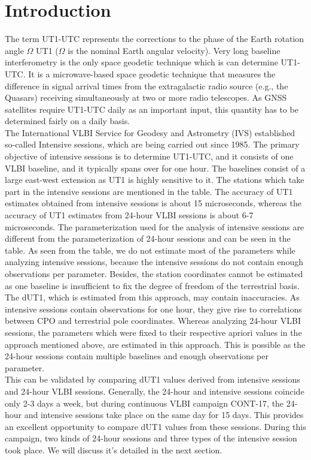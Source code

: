 \documentclass[smallextended]{svjour3}       %
\begin{document}
\section{Introduction}
\label{intro}
The term UT1-UTC represents the corrections to the phase of the Earth rotation angle $\Omega$ UT1 ($\Omega$ is the nominal Earth angular velocity). Very long baseline interferometry is the only space geodetic technique which is can determine UT1-UTC. It is a microwave-based space geodetic technique that measures the difference in signal arrival times from the extragalactic radio source (e.g., the Quasars) receiving simultaneously at two or more radio telescopes. As GNSS satellites require UT1-UTC daily as an important input, this quantity has to be determined fairly on a daily basis. \\
The International VLBI Service for Geodesy and Astrometry (IVS) established so-called Intensive sessions, which are being carried out since 1985. The primary objective of intensive sessions is to determine UT1-UTC, and it consists of one VLBI baseline, and it typically spans over for one hour. The baselines consist of a large east-west extension as UT1 is highly sensitive to it. The stations which take part in the intensive sessions are mentioned in the table. The accuracy of UT1 estimates obtained from intensive sessions is about 15 microseconds, whereas the accuracy of UT1 estimates from 24-hour VLBI sessions is about 6-7 microseconds. The parameterization used for the analysis of intensive sessions are different from the parameterization of 24-hour sessions and can be seen in the table. As seen from the table, we do not estimate most of the parameters while analyzing intensive sessions, because the intensive sessions do not contain enough observations per parameter. Besides, the station coordinates cannot be estimated as one baseline is insufficient to fix the degree of freedom of the terrestrial basis. The dUT1, which is estimated from this approach, may contain inaccuracies. As intensive sessions contain observations for one hour, they give rise to correlations between CPO and terrestrial pole coordinates. Whereas analyzing 24-hour VLBI sessions, the parameters which were fixed to their respective apriori values in the approach mentioned above, are estimated in this approach. This is possible as the 24-hour sessions contain multiple baselines and enough observations per parameter. \\
This can be validated by comparing dUT1 values derived from intensive sessions and 24-hour VLBI sessions. Generally, the 24-hour and intensive sessions coincide only 2-3 days a week, but during continuous VLBI campaign CONT-17, the 24-hour and intensive sessions take place on the same day for 15 days. This provides an excellent opportunity to compare dUT1 values from these sessions. During this campaign, two kinds of 24-hour sessions and three types of the intensive session took place. We will discuss it's detailed in the next section.
\end{document}
